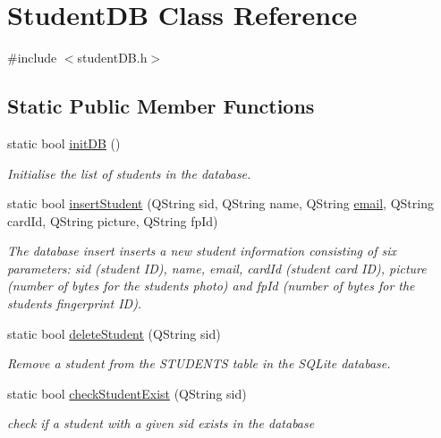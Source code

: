 \hypertarget{class_student_d_b}{}\section{Student\+D\+B Class Reference}
\label{class_student_d_b}


{\ttfamily \#include $<$student\+D\+B.\+h$>$}

\subsection*{Static Public Member Functions}
\begin{DoxyCompactItemize}
\item 
static bool \hyperlink{class_student_d_b_a28b1fc4c78fa28c401cf823d20203870}{init\+D\+B} ()
\begin{DoxyCompactList}\small\item\em Initialise the list of students in the database. \end{DoxyCompactList}\item 
static bool \hyperlink{class_student_d_b_a4d825a8a4cc4bad150ef0007c0aab41e}{insert\+Student} (Q\+String sid, Q\+String name, Q\+String \hyperlink{test_email_8h_ad5727e447818d4c056038b4e0941ac50}{email}, Q\+String card\+Id, Q\+String picture, Q\+String fp\+Id)
\begin{DoxyCompactList}\small\item\em The database insert inserts a new student information consisting of six parameters\+: sid (student I\+D), name, email, card\+Id (student card I\+D), picture (number of bytes for the student\textquotesingle{}s photo) and fp\+Id (number of bytes for the student\textquotesingle{}s fingerprint I\+D). \end{DoxyCompactList}\item 
static bool \hyperlink{class_student_d_b_ad523ce3b196a299535f8855a5c60a93a}{delete\+Student} (Q\+String sid)
\begin{DoxyCompactList}\small\item\em Remove a student from the S\+T\+U\+D\+E\+N\+T\+S table in the S\+Q\+Lite database. \end{DoxyCompactList}\item 
static bool \hyperlink{class_student_d_b_a77c06dcacdf92b1ca2be118e05491667}{check\+Student\+Exist} (Q\+String sid)
\begin{DoxyCompactList}\small\item\em check if a student with a given sid exists in the database \end{DoxyCompactList}\item 

\end{DoxyCompactItemize}
